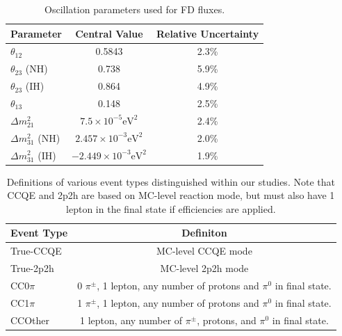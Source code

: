 \documentclass[12pt]{article}
\begin{document}
\begin{table}
\centering
 \begin{tabular}{| l  c  c |} 
 \hline 
 Parameter & Central Value & Relative Uncertainty\\ [0.5ex] 
 \hline
 $\theta_{12}$ & 0.5843 & 2.3\% \\ 
 $\theta_{23}$ (NH) & 0.738 & 5.9\% \\
 $\theta_{23}$ (IH) & 0.864 & 4.9\% \\
 $\theta_{13}$ & 0.148 & 2.5\% \\ 
 $\Delta m^2_{21}$ & $7.5\times10^{-5} \textrm{eV}^2$ & 2.4\% \\
 $\Delta m^2_{31}$ (NH) & $2.457\times10^{-3} \textrm{eV}^2$ & 2.0\% \\
 $\Delta m^2_{31}$ (IH) & $-2.449\times10^{-3} \textrm{eV}^2$ & 1.9\% \\[1ex]
 \hline
\end{tabular}
\caption{Oscillation parameters used for FD fluxes.}
\label{tab:osc}
\end{table}

\begin{table}
\centering
 \begin{tabular}{| l  c  |} 
 \hline 
 Event Type & Definiton\\ [0.5ex] 
 \hline
 True-CCQE & MC-level CCQE mode \\ 
 True-2p2h & MC-level 2p2h mode \\
 CC0$\pi$ & 0 $\pi^{\pm}$, 1 lepton, any number of protons and $\pi^0$ in final state. \\
 CC1$\pi$ & 1 $\pi^{\pm}$, 1 lepton, any number of protons and $\pi^0$ in final state. \\
 CCOther & 1 lepton, any number of $\pi^{\pm}$, protons, and $\pi^0$ in final state. \\ [1ex]
 \hline
\end{tabular}
\caption{Definitions of various event types distinguished within our studies. Note that CCQE and 2p2h are based on MC-level reaction mode, but must also have 1 lepton in the final state if efficiencies are applied.}
\label{tab:events}
\end{table}


\FloatBarrier
\end{document}
